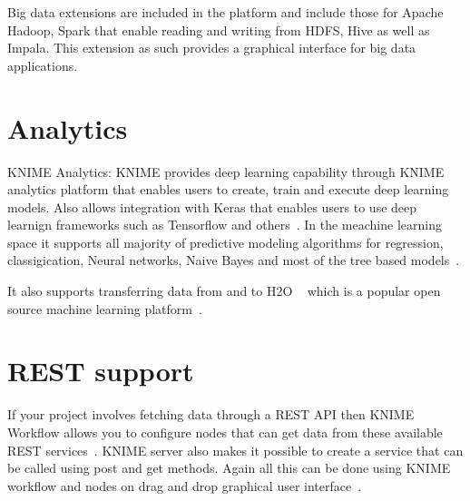 Big data extensions are included in the platform and include those for Apache
Hadoop, Spark that enable reading and writing from HDFS, Hive as well as
Impala. This extension as such provides a graphical interface for big data
applications.

\section{Analytics}
KNIME Analytics: KNIME provides deep learning capability through KNIME analytics
platform that enables users to create, train and execute deep learning
models. Also allows integration with Keras that enables users to use deep
learnign frameworks such as Tensorflow and others~\cite{hid-sp18-517-dl}. In the
meachine learning space it supports all majority of predictive modeling
algorithms for regression, classigication, Neural networks, Naive Bayes and most
of the tree based models~\cite{hid-sp18-517-pml}.

It also supports transferring data from and to H2O ~\cite{hid-sp18-517-h20}
which is a popular open source machine learning
platform~\cite{hid-sp18-517-knimeh20}.

\section{REST support}

If your project involves fetching data through a REST API then KNIME Workflow
allows you to configure nodes that can get data from these available REST
services~\cite{hid-sp18-517-knimeapi}.  KNIME server also makes it possible to
create a service that can be called using post and get methods.  Again all this
can be done using KNIME workflow and nodes on drag and drop graphical user
interface~\cite{hid-sp18-517-knimerest}.

